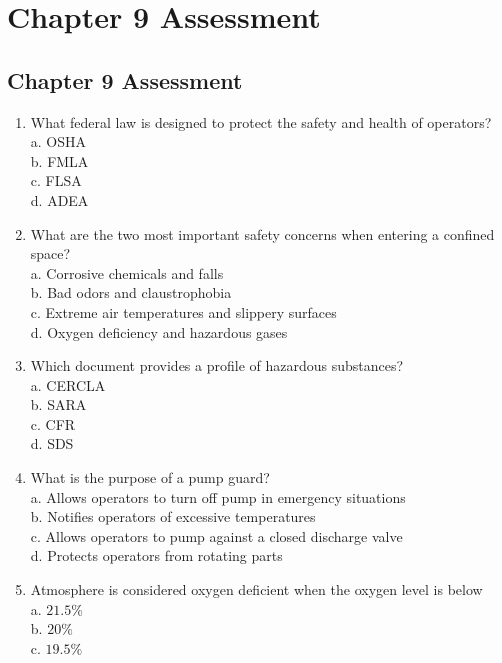 
\chapter*{Chapter 9 Assessment}

\section*{Chapter 9 Assessment}
\begin{enumerate}[1.]
\item What federal law is designed to protect the safety and health of operators?\\
a. OSHA\\
b. FMLA\\
c. FLSA\\
d. ADEA\\
\item What are the two most important safety concerns when entering a confined space?\\
a. Corrosive chemicals and falls\\
b. Bad odors and claustrophobia\\
c. Extreme air temperatures and slippery surfaces\\
d. Oxygen deficiency and hazardous gases\\
\item Which document provides a profile of hazardous substances?\\
a. CERCLA\\
b. SARA\\
c. CFR\\
d. SDS\\
\item What is the purpose of a pump guard?\\
a. Allows operators to turn off pump in emergency situations\\
b. Notifies operators of excessive temperatures\\
c. Allows operators to pump against a closed discharge valve\\
d. Protects operators from rotating parts\\
\item Atmosphere is considered oxygen deficient when the oxygen level is below\\
a. $21.5 \%$\\
b. $20 \%$\\
c. $19.5 \%$\\

\end{enumerate}
